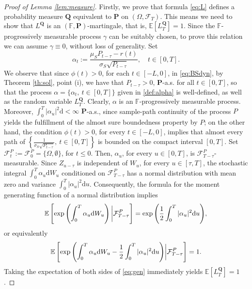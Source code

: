 \documentclass[12pt,centertags,reqno]{amsart}
\numberwithin{equation}{section} \makeatletter
\def \F {\mathcal F}
\def \P {\mathbf P}
\def \Q {\mathbf Q}
\def \bF {\mathbb F}
\newcommand{\ud}{\mathrm d}
\newcommand{\esp}[2][\mathbb E] {#1\left[#2\right]}
\begin{document}
\begin{proof}[Proof of Lemma \ref{lem:measure}]

Firstly, we prove that formula \eqref{eq:L} defines a probability measure $\Q$ equivalent to $\P$ on $(\Omega,\F_T)$. This means we need to show that $L^\Q$ is an $(\bF,\P)$-martingale, that is, $\esp{L_T^\Q}=1$. Since the $\bF$-progressively measurable process $\gamma$ can be suitably chosen, to prove this relation we can assume $\gamma \equiv 0$, without loss of generality.  
Set 
\begin{equation}\label{def:alpha}
\alpha_t := \frac{\mu_S P_{t-\tau}-r(t)}{\sigma_S \sqrt{P_{t-\tau}}}, \quad t \in [0,T].
\end{equation}
We observe that since $\phi(t) > 0$, for each $t \in [-L,0]$, in \eqref{eq:BSdyn},
by Theorem \ref{th:sol}, point (i), we have that $P_{t-\tau} > 0$, $\P$-a.s. for all $t \in [0,T]$, so that the process $\alpha=\{\alpha_t,\ t \in [0,T]\}$ given in \eqref{def:alpha} is well-defined, as well as the random variable $L_T^\Q$.
Clearly, $\alpha$ is an $\bF$-progressively measurable process. Moreover, $\int_0^T|\alpha_u|^2 \ud < \infty$ $\P$-a.s., since sample-path continuity of the process $P$ yields the fulfillment of the almost sure boundedness property by $P$; on the other hand, the condition $\phi(t)>0$, for every $t \in [-L,0]$, implies that almost every path of $\left\{\frac{1}{\sigma_S \sqrt{P_{t-\tau}}},\ t \in [0,T]\right\}$ is bounded on the compact interval $[0,T]$.
Set $\F_t^P:=\F_0^P=\{\Omega,\emptyset\}$, for $t \leq 0$. Then, $\alpha_u$, for every $u \in [0,T]$, is $\F_{T-\tau}^P$-measurable. 
Since $Z_{u-\tau}$ is independent of $W_u$, for every $u \in [\tau, T]$, the stochastic integral $\int_0^T \alpha_u \ud W_u$ conditioned on $\F_{T-\tau}^P$ has a normal distribution with mean zero and variance $\int_0^T |\alpha_u|^2 \ud u$. Consequently, the formula for the moment generating function of a normal distribution implies
$$
\esp{\exp{\left(\int_0^T \alpha_u \ud W_u\right)\bigg{|}\F_{T-\tau}^P}}=\exp{\left(\frac{1}{2}\int_0^T |\alpha_u|^2 \ud u\right)},
$$
or equivalently
\begin{equation}\label{eq:gen}
\esp{\exp{\left(\int_0^T \alpha_u \ud W_u-\frac{1}{2}\int_0^T |\alpha_u|^2 \ud u\right)}\bigg{|}\F_{T-\tau}^P}=1.
\end{equation}
Taking the expectation of both sides of \eqref{eq:gen} immediately yields $\esp{L_T^\Q}=1$.

\end{proof}
\end{document}
